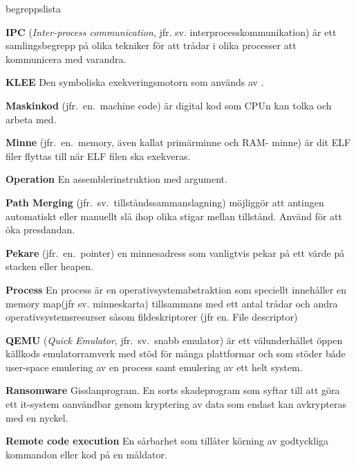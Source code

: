 \begin{labeling}{begreppslista}
    \item [\textbf{IPC}] (\emph{Inter-process communication}, jfr. sv.
          interprocesskommunikation) är ett samlingsbegrepp på olika
    tekniker för att trådar i olika processer att kommunicera med
    varandra.

    \item [\textbf{KLEE}] Den symboliska exekveringsmotorn som används
    av \stoe{}.

    \item [\textbf{Maskinkod}] (jfr.\ en.\ machine code) är digital
    kod som CPUn kan tolka och arbeta med.

    \item [\textbf{Minne}] (jfr.\ en.\ memory, även kallat primärminne
          och RAM- minne) är dit ELF filer flyttas till när ELF filen
    ska exekveras.

    \item [\textbf{Operation}] En assemblerinstruktion med argument.

    \item [\textbf{Path Merging}]
          (jfr.\ sv.\ tillståndssammanslagning) möjliggör att antingen
    automatiskt eller manuellt slå ihop olika stigar mellan
    tillstånd.  Använd för att öka presdandan.

    \item [\textbf{Pekare}] (jfr.\ en.\ pointer) en minnesadress som
    vanligtvis pekar på ett värde på stacken eller heapen.

    \item [\textbf{Process}] En process är en
    operativsystemabstraktion som speciellt innehåller en memory
    map(jfr sv. minneskarta) tillsammans med ett antal trådar och
    andra operativsystemsresurser såsom fildeskriptorer (jfr
    en. File descriptor)

    \item [\textbf{QEMU}] (\emph{Quick Emulator}, jfr.\ sv.\ snabb
          emulator) är ett välunderhållet öppen källkods emulatorramverk
    med stöd för många plattformar och som stöder både user-space
    emulering av en process samt emulering av ett helt system.

    \item [\textbf{Ransomware}] Gisslanprogram. En sorts skadeprogram
    som syftar till att göra ett it-system oanvändbar genom
    kryptering av data som endast kan avkrypteras med en nyckel.

    \item [\textbf{Remote code execution}] En sårbarhet som tillåter
    körning av godtyckliga kommandon eller kod på en måldator.


\end{labeling}
